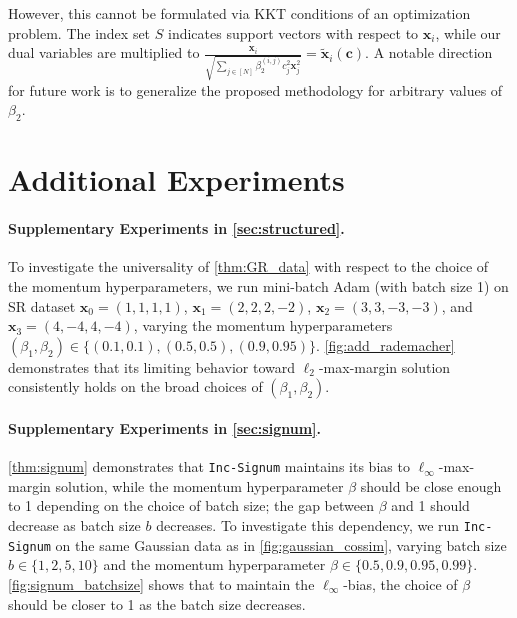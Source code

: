 \documentclass{article} %
\theoremstyle{plain}
\theoremstyle{definition}
\theoremstyle{remark}
\def\bx{{\mathbf x}}
\def\bc{{\mathbf c}}
\begin{document}
However, this cannot be formulated via KKT conditions of an optimization problem. The index set $S$ indicates support vectors with respect to $\bx_i$, while our dual variables are multiplied to $\frac{\bx_i}{\sqrt{\sum_{j\in[N]} \beta_2^{(i, j)}c_j^2 \bx_j^2}}=\tilde{\bx}_i(\bc)$. A notable direction for future work is to generalize the proposed methodology for arbitrary values of $\beta_2$.

\section{Additional Experiments}\label{appendix:additional_exps}
\paragraph{Supplementary Experiments in \cref{sec:structured}.}
To investigate the universality of \cref{thm:GR_data} with respect to the choice of the momentum hyperparameters, we run mini-batch Adam (with batch size 1) on SR dataset $\bx_0=(1,1,1,1)$, $\bx_1 = (2,2,2,-2)$, $\bx_2 = (3,3,-3,-3)$, and $\bx_3 = (4,-4,4,-4)$, varying the momentum hyperparameters $(\beta_1, \beta_2) \in \{(0.1, 0.1), (0.5, 0.5), (0.9, 0.95)\}$. \cref{fig:add_rademacher} demonstrates that its limiting behavior toward $\ell_2$-max-margin solution consistently holds on the broad choices of $(\beta_1, \beta_2)$. 

\paragraph{Supplementary Experiments in \cref{sec:signum}.}
\cref{thm:signum} demonstrates that \texttt{Inc-Signum} maintains its bias to $\ell_\infty$-max-margin solution, while the momentum hyperparameter $\beta$ should be close enough to 1 depending on the choice of batch size; the gap between $\beta$ and 1 should decrease as batch size $b$ decreases. To investigate this dependency, we run \texttt{Inc-Signum} on the same Gaussian data as in \cref{fig:gaussian_cossim}, varying batch size $b \in \{1, 2, 5, 10\}$ and the momentum hyperparameter $\beta \in \{0.5, 0.9, 0.95, 0.99\}$. \cref{fig:signum_batchsize} shows that to maintain the $\ell_\infty$-bias, the choice of $\beta$ should be closer to 1 as the batch size decreases.
\end{document}
